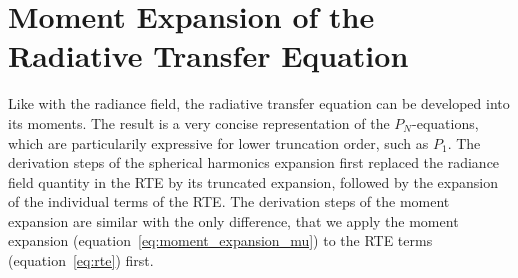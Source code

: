 \section{Moment Expansion of the Radiative Transfer Equation}


Like with the radiance field, the radiative transfer equation can be developed into its moments. The result is a very concise representation of the $P_N$-equations, which are particularily expressive for lower truncation order, such as $P_1$. The derivation steps of the spherical harmonics expansion first replaced the radiance field quantity in the RTE by its truncated expansion, followed by the expansion of the individual terms of the RTE. The derivation steps of the moment expansion are similar with the only difference, that we apply the moment expansion (equation~\ref{eq:moment_expansion_mu}) to the RTE terms (equation~\ref{eq:rte}) first.

